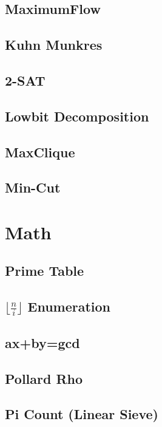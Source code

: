 \documentclass[a4paper,10pt,twocolumn,oneside]{article}
\begin{document}
\subsection{MaximumFlow}

\subsection{Kuhn Munkres}

\subsection{2-SAT}

\subsection{Lowbit Decomposition}

\subsection{MaxClique}

\subsection{Min-Cut}


\section{Math}
\subsection{Prime Table}

\subsection{$\lfloor \frac{n}{i} \rfloor$ Enumeration}

\subsection{ax+by=gcd}

\subsection{Pollard Rho}

\subsection{Pi Count (Linear Sieve)}

\end{document}
